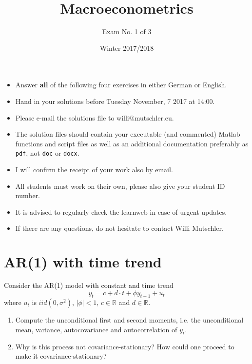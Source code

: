 \documentclass{article}
\begin{document}
\title{Macroeconometrics}
\author{Exam No. 1 of 3}
\date{Winter 2017/2018}
\maketitle

\begin{itemize}
\item Answer \textbf{all} of the following four exercises in either German or English.

\item Hand in your solutions before Tuesday November, 7 2017 at 14:00.

\item Please e-mail the solutions file to willi@mutschler.eu. 

\item The solution files should contain your executable (and commented) Matlab functions and script files as well as an additional documentation preferably as \texttt{pdf}, not \texttt{doc} or \texttt{docx}. 

\item I will confirm the receipt of your work also by email.

\item All students must work on their own, please also give your student ID number.

\item It is advised to regularly check the learnweb in case of urgent updates.

\item If there are any questions, do not hesitate to contact Willi Mutschler.
\end{itemize}
\newpage

\section{AR(1) with time trend}
Consider the AR(1) model with constant and time trend
$$ y_t = c + d\cdot t + \phi y_{t-1} + u_t$$
where $u_t$ is $iid(0,\sigma^2)$, $|\phi|<1$, $c \in \mathbb{R}$ and $d \in \mathbb{R}$.
\begin{enumerate}
	\item Compute the unconditional first and second moments, i.e. the unconditional mean, variance, autocovariance and autocorrelation of $y_t$.
	\item Why is this process not covariance-stationary? How could one proceed to make it covariance-stationary?
\end{enumerate}
\newpage
\end{document}

